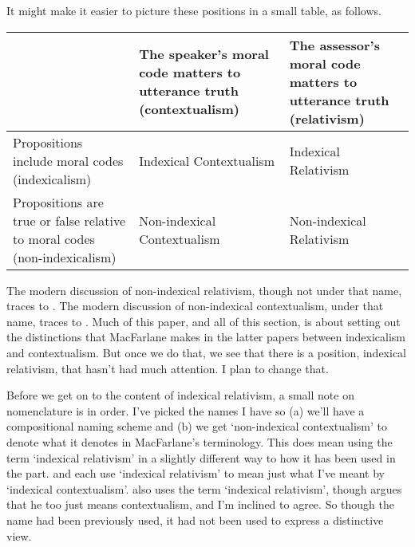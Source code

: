 \noindent It might make it easier to picture these positions in a small table, as follows.

\medskip
\begin{raggedright}
\begin{supertabular}{m{0.29\textwidth} | m{0.29\textwidth} | m{0.29\textwidth}}
~ & The speaker's moral  code matters to utterance  truth \newline
(contextualism) &
The assessor's moral  code matters to utterance  truth \newline
(relativism) \tabularnewline \hline
Propositions include  moral codes \newline
(indexicalism) &
 Indexical
Contextualism &
 Indexical
Relativism \tabularnewline \hline
Propositions are true  or false relative  to moral codes \newline
 (non-indexicalism) &
 Non-indexical
Contextualism &
 Non-indexical \newline
Relativism \tabularnewline
\end{supertabular}
\end{raggedright}
\medskip

\noindent The modern discussion of non-indexical relativism, though not under that name, traces to \cite{MacFarlane2003-MACFCA-2}. The modern discussion of non-indexical contextualism, under that name, traces to \cite{MacFarlane2007-SMNIC, MacFarlane2009-MACNC}. Much of this paper, and all of this section, is about setting out the distinctions that MacFarlane makes in the latter papers between indexicalism and contextualism. But once we do that, we see that there is a position, indexical relativism, that hasn't had much attention. I plan to change that.

Before we get on to the content of indexical relativism, a small note on nomenclature is in order. I've picked the names I have so (a) we'll have a compositional naming scheme and (b) we get `non-indexical contextualism' to denote what it denotes in MacFarlane's terminology. This does mean using the term `indexical relativism' in a slightly different way to how it has been used in the part. \cite{Einheuser2008} and \cite{LopezDeSaMs} each use `indexical relativism' to mean just what I've meant by `indexical contextualism'. \cite{Kolbel2004a} also uses the term `indexical relativism', though \cite{LopezDeSa2007a} argues that he too just means contextualism, and I'm inclined to agree. So though the name had been previously used, it had not been used to express a distinctive view.

